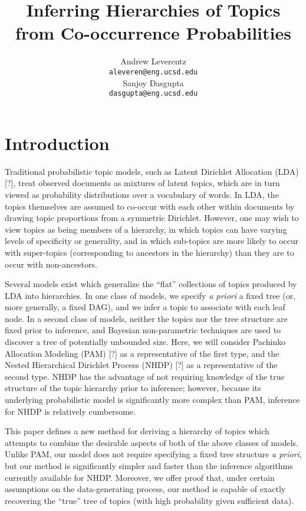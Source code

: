 \documentclass{article}
\title{Inferring Hierarchies of Topics from Co-occurrence Probabilities}
\author{
  Andrew Leverentz \\
  \texttt{aleveren@eng.ucsd.edu} \\
  Sanjoy Dasgupta \\
  \texttt{dasgupta@eng.ucsd.edu}
}
\date{}
\theoremstyle{definition}
\newcommand{\TODOcite}{[?]}
\begin{document}
\maketitle


\section{Introduction}

Traditional probabilistic topic models, such as Latent Dirichlet Allocation (LDA) \TODOcite{}, treat observed documents as mixtures of latent topics, which are in turn viewed as probability distributions over a vocabulary of words.
In LDA, the topics themselves are assumed to co-occur with each other within documents by drawing topic proportions from a symmetric Dirichlet.
However, one may wish to view topics as being members of a hierarchy, in which topics can have varying levels of specificity or generality, and in which sub-topics are more likely to occur with super-topics (corresponding to ancestors in the hierarchy) than they are to occur with non-ancestors.

Several models exist which generalize the ``flat'' collections of topics produced by LDA into hierarchies.
In one class of models, we specify \emph{a priori} a fixed tree (or, more generally, a fixed DAG), and we infer a topic to associate with each leaf node.
In a second class of models, neither the topics nor the tree structure are fixed prior to inference, and Bayesian non-parametric techniques are used to discover a tree of potentially unbounded size.
Here, we will consider Pachinko Allocation Modeling (PAM) \TODOcite{} as a representative of the first type, and the Nested Hierarchical Dirichlet Process (NHDP) \TODOcite{} as a representative of the second type.
NHDP has the advantage of not requiring knowledge of the true structure of the topic hierarchy prior to inference;
however, because its underlying probabilistic model is significantly more complex than PAM, inference for NHDP is relatively cumbersome.

This paper defines a new method for deriving a hierarchy of topics which attempts to combine the desirable aspects of both of the above classes of models.
Unlike PAM, our model does not require specifying a fixed tree structure \emph{a priori}, but our method is significantly simpler and faster than the inference algorithms currently available for NHDP.
Moreover, we offer proof that, under certain assumptions on the data-generating process, our method is capable of exactly recovering the ``true'' tree of topics (with high probability given sufficient data).
\end{document}
